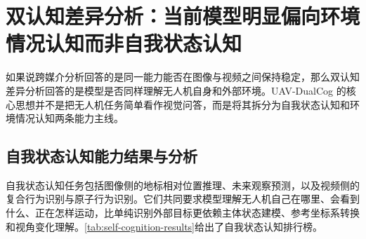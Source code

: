 \FloatBarrier
\section{双认知差异分析：当前模型明显偏向环境情况认知而非自我状态认知}

如果说跨媒介分析回答的是同一能力能否在图像与视频之间保持稳定，那么双认知差异分析回答的是模型是否同样理解无人机自身和外部环境。UAV-DualCog 的核心思想并不是把无人机任务简单看作视觉问答，而是将其拆分为自我状态认知和环境情况认知两条能力主线。

\subsection{自我状态认知能力结果与分析}

自我状态认知任务包括图像侧的地标相对位置推理、未来观察预测，以及视频侧的复合行为识别与原子行为识别。它们共同要求模型理解无人机自己在哪里、会看到什么、正在怎样运动，比单纯识别外部目标更依赖主体状态建模、参考坐标系转换和视角变化理解。\autoref{tab:self-cognition-results}给出了自我状态认知排行榜。

